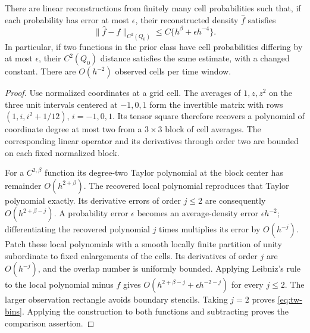 \begin{lemma}
\label{lem:tw-bins}
There are linear reconstructions from finitely many cell probabilities
such that, if each probability has error at most $\epsilon$, their
reconstructed density $\widehat f$ satisfies
\begin{equation}\label{eq:tw-bins}
 \|\widehat f-f\|_{C^2(Q_0)}
             \le C\{h^\beta+\epsilon h^{-4}\}.
\end{equation}
In particular, if two functions in the prior class have cell
probabilities differing by at most $\epsilon$, their $C^2(Q_0)$
distance satisfies the same estimate, with a changed constant.
There are $O(h^{-2})$ observed cells per time window.
\end{lemma}
\begin{proof}
Use normalized coordinates at a grid cell. The averages of
$1,z,z^2$ on the three unit intervals centered at $-1,0,1$ form the
invertible matrix with rows $(1,i,i^2+1/12)$, $i=-1,0,1$.
Its tensor square therefore recovers a polynomial of coordinate degree
at most two from a $3\times3$ block of cell averages. The corresponding
linear operator and its derivatives through order two are bounded
on each fixed normalized block.

For a $C^{2,\beta}$ function its degree-two Taylor polynomial at the
block center has remainder $O(h^{2+\beta})$. The recovered local
polynomial reproduces that Taylor polynomial exactly. Its derivative
errors of order $j\le2$ are consequently $O(h^{2+\beta-j})$.
A probability error $\epsilon$ becomes an average-density error
$\epsilon h^{-2}$; differentiating the recovered polynomial $j$
times multiplies its error by $O(h^{-j})$. Patch these local
polynomials with a smooth locally finite partition of unity subordinate
to fixed enlargements of the cells. Its derivatives of order $j$ are
$O(h^{-j})$, and the overlap number is uniformly bounded. Applying
Leibniz's rule to the local polynomial minus $f$ gives
$O(h^{2+\beta-j}+\epsilon h^{-2-j})$ for every $j\le2$.
The larger observation rectangle avoids boundary stencils. Taking
$j=2$ proves \eqref{eq:tw-bins}. Applying the construction to both
functions and subtracting proves the comparison assertion.
\end{proof}

